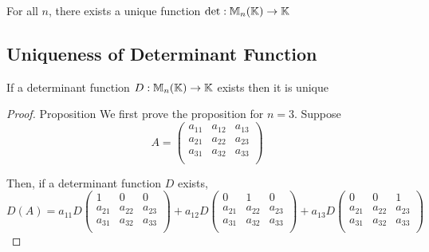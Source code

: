 
\begin{goal}
    For all \(n\), there exists a unique function \(\det: \mathbb{M}_n(\mathbb{K}) \to \mathbb{K}\)
\end{goal}

\subsection{Uniqueness of Determinant Function}
\begin{proposition}
    If a determinant function \(D: \mathbb{M}_n(\mathbb{K}) \to \mathbb{K}\) exists then it is unique
\end{proposition}

\begin{proof} {Proposition}
    We first prove the proposition for \(n = 3\). Suppose \[
        A = \begin{pmatrix}
            a_{11} & a_{12} & a_{13} \\
            a_{21} & a_{22} & a_{23} \\
            a_{31} & a_{32} & a_{33} \\
        \end{pmatrix}
    \]

    Then, if a determinant function \(D\) exists,
    \[
        D(A) = a_{11} D\begin{pmatrix}
            1      & 0      & 0      \\
            a_{21} & a_{22} & a_{23} \\
            a_{31} & a_{32} & a_{33} \\
        \end{pmatrix} + a_{12} D\begin{pmatrix}
            0      & 1      & 0      \\
            a_{21} & a_{22} & a_{23} \\
            a_{31} & a_{32} & a_{33} \\
        \end{pmatrix} + a_{13} D\begin{pmatrix}
            0      & 0      & 1      \\
            a_{21} & a_{22} & a_{23} \\
            a_{31} & a_{32} & a_{33} \\
        \end{pmatrix}
    \]


\end{proof}
